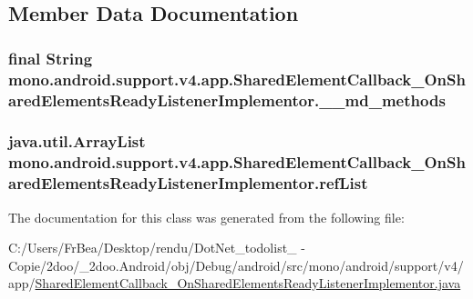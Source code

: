 \subsection{Member Data Documentation}
\hypertarget{classmono_1_1android_1_1support_1_1v4_1_1app_1_1_shared_element_callback___on_shared_elements_ready_listener_implementor_23f34ccac6fe95f25d35d1a3d4f1c957}{
\subsubsection[{\_\-\_\-md\_\-methods}]{\setlength{\rightskip}{0pt plus 5cm}final String {\bf mono.android.support.v4.app.SharedElementCallback\_\-OnSharedElementsReadyListenerImplementor.\_\-\_\-md\_\-methods}}}
\label{classmono_1_1android_1_1support_1_1v4_1_1app_1_1_shared_element_callback___on_shared_elements_ready_listener_implementor_23f34ccac6fe95f25d35d1a3d4f1c957}


\hypertarget{classmono_1_1android_1_1support_1_1v4_1_1app_1_1_shared_element_callback___on_shared_elements_ready_listener_implementor_ae31653e3845f37f3a15997b7034f497}{
\subsubsection[{refList}]{\setlength{\rightskip}{0pt plus 5cm}java.util.ArrayList {\bf mono.android.support.v4.app.SharedElementCallback\_\-OnSharedElementsReadyListenerImplementor.refList}}}
\label{classmono_1_1android_1_1support_1_1v4_1_1app_1_1_shared_element_callback___on_shared_elements_ready_listener_implementor_ae31653e3845f37f3a15997b7034f497}




The documentation for this class was generated from the following file:\begin{CompactItemize}
\item 
C:/Users/FrBea/Desktop/rendu/DotNet\_\-todolist\_ - Copie/2doo/\_\-2doo.Android/obj/Debug/android/src/mono/android/support/v4/app/\hyperlink{_shared_element_callback___on_shared_elements_ready_listener_implementor_8java}{SharedElementCallback\_\-OnSharedElementsReadyListenerImplementor.java}\end{CompactItemize}
